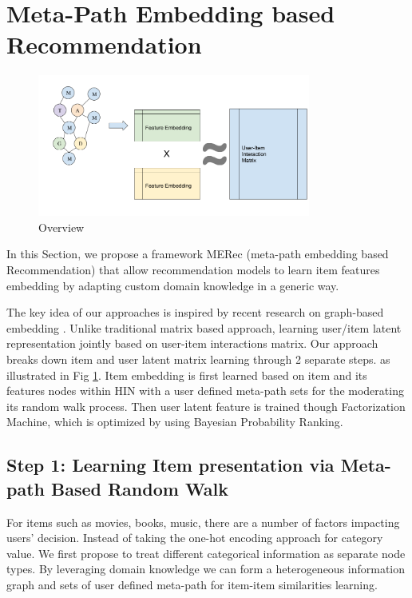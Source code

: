 \section{Meta-Path Embedding based Recommendation}

\begin{figure}[!t]
    \centering
    \includegraphics[width=0.8\textwidth]{figs/fig0.png}
    \caption{Overview}\label{fig:fe-overview}
\end{figure}

In this Section, we propose a framework MERec (meta-path embedding based Recommendation) that allow recommendation models to learn item features embedding by adapting custom domain knowledge in a generic way. 

The key idea of our approaches is inspired by recent research on graph-based embedding \cite{dong2017metapath2vec}. Unlike traditional matrix based approach, learning user/item latent representation jointly based on user-item interactions matrix. Our approach breaks down item and user latent matrix learning through 2 separate steps. as illustrated in Fig \ref{fig:fe-overview}. Item embedding is first learned based on item and its features nodes within HIN with a user defined meta-path sets for the moderating its random walk process. Then user latent feature is trained though Factorization Machine, which is optimized by using Bayesian Probability Ranking.

\subsection{Step 1: Learning Item presentation via Meta-path Based Random Walk}\label{3MF}

For items such as movies, books, music, there are a number of factors impacting users' decision. Instead of taking the one-hot encoding approach for category value. We first propose to treat different categorical information as separate node types. 
By leveraging domain knowledge we can form a heterogeneous information graph and sets of user defined meta-path for item-item similarities learning. 


